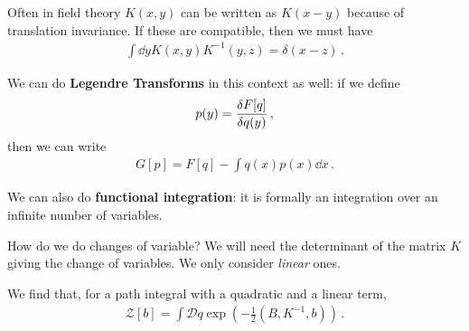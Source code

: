 \documentclass[main.tex]{subfiles}
\begin{document}
Often in field theory \(K(x, y)\) can be written as \(K(x-y)\) because of translation invariance. If these are compatible, then we must have 
%
\begin{align}
\int \dd{y} K(x, y) K^{-1} (y, z) = \delta (x-z)
\,.
\end{align}

We can do \textbf{Legendre Transforms} in this context as well: if we define 
%
\begin{align}
p(y) = \fdv{F[q]}{q(y)}
\,,
\end{align}
%
then we can write 
%
\begin{align}
G[p] = F[q] - \int q(x) p(x) \dd{x}
\,.
\end{align}


We can also do \textbf{functional integration}: it is formally an integration over an infinite number of variables. 

How do we do changes of variable? We will need the determinant of the matrix \(K\) giving the change of variables. 
We only consider \emph{linear} ones. 

We find that, for a path integral with a quadratic and a linear term, 
%
\begin{align}
\mathscr{Z} [b] = \int \mathcal{D}q \exp(- \frac{1}{2} (B, K^{-1}, b))
\,.
\end{align}
%
\end{document}
